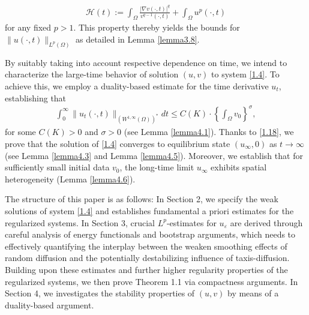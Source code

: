 \documentclass[12pt]{article}
\theoremstyle{plain}
\theoremstyle{definition}
\numberwithin{equation}{section}
\begin{document}
         \begin{align*}
           \mathcal{ H}(t):=\int_{\Omega}\frac{|\nabla v(\cdot,t)|^q}{v^{q-1}(\cdot,t)}+\int_{\Omega}u^{p}(\cdot,t)
        \end{align*}
        for any fixed $p>1$.
         This property thereby yields the bounds for $\|u(\cdot,t)\|_{L^{p}(\Omega)}$ as detailed in Lemma \ref{lemma3.8}.

By suitably taking into account respective dependence  on time,
 we intend to characterize the large-time behavior of solution $(u,v)$ to system \eqref{1.4}. To achieve this, we employ a duality-based estimate for the time derivative $u_t$, establishing that
\begin{align}\label{1.18}
    \int_0^{\infty}\|u_t(\cdot,t)\|_{(W^{1,\infty}(\Omega))^*}dt\leq C(K)\cdot\left\{ \int_{\Omega} v_0\right\}^\sigma,
\end{align}
for some  $C(K)>0$  and $\sigma>0$ (see Lemma \ref{lemma4.1}). Thanks to  \eqref{1.18}, we prove that the solution of \eqref{1.4} converges to equilibrium state $(u_{\infty},0)$ as $t\to \infty$ (see Lemma \ref{lemma4.3} and Lemma \ref{lemma4.5}). Moreover, we  establish that for sufficiently small initial data $v_0$, the long-time limit $u_{\infty}$
  exhibits spatial heterogeneity (Lemma \ref{lemma4.6}).



The structure of this paper is as follows: In Section 2,  we specify the weak solutions of system  \eqref{1.4} and
 establishes fundamental a priori estimates for the regularized systems.
 In Section 3, crucial $L^p$-estimates for $u_\varepsilon$ are derived  through careful analysis of energy functionals and bootstrap
  arguments, which  needs  to effectively quantifying  the interplay between the weaken smoothing effects of random diffusion  and the potentially destabilizing influence of taxis-diffusion.
    Building upon these estimates and further higher regularity properties of the regularized systems, we then
    prove Theorem 1.1 via compactness arguments. In Section 4, we investigates the stability properties of $(u,v)$ by means of a duality-based argument.
\end{document}
